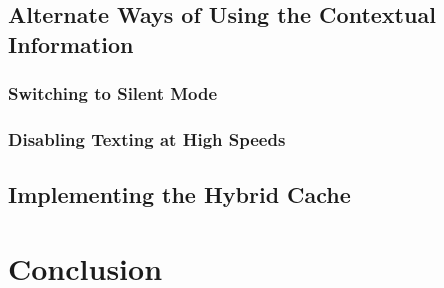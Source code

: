 \documentclass[12pt]{uthesis-v12}  %
\begin{document}
	\section{Alternate Ways of Using the Contextual Information}
			
		\subsection{Switching to Silent Mode}
			
		\subsection{Disabling Texting at High Speeds}
		
	\section{Implementing the Hybrid Cache}

\chapter{Conclusion}		

\end{document}
